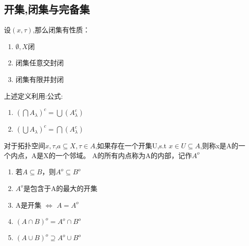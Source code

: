 \subsection{开集,闭集与完备集}
\begin{Theorem}
    设\(\left(x,\tau\right)\),那么闭集有性质：
    \begin{enumerate}
        \item \(\emptyset,X\)闭 \\
        \item 闭集任意交封闭 \\
        \item 闭集有限并封闭
    \end{enumerate}
\end{Theorem}
\begin{note}
    上述定义利用:公式:
    \begin{enumerate}
        \item \({(\bigcap A_{\lambda})}^{c}=\bigcup(A_{\lambda}^{c})\) \\
        \item \({(\bigcup A_{\lambda})}^{c}=\bigcap(A_{\lambda}^{c})\)
    \end{enumerate}
\end{note}
\begin{Definition}
    对于拓扑空间\(x,\tau\),\(a \subseteq X,\tau \in A\),如果存在一个开集U,s.t \(x \in U \subseteq A\),则称x是A的一个内点，A是X的一个邻域。
    A的所有内点称为A的内部，记作\(A^{o}\)
\end{Definition}
\begin{Corollary}
    \begin{enumerate}
        \item 若\(A \subseteq B\)，则\(A^{o}\subseteq B^{o}\) \\
        \item \(A^{o}\)是包含于A的最大的开集\\
        \item A是开集 \(\Longleftrightarrow \) \(A=A^{o}\) \\
        \item \({\left(A \cap B\right)}^{o} = {A}^{o}\cap {B}^{o}\)\\
        \item \({\left(A \cup B\right)}^{o} \supseteq A^{o}\cup B^{o}\)
    \end{enumerate}
\end{Corollary}
